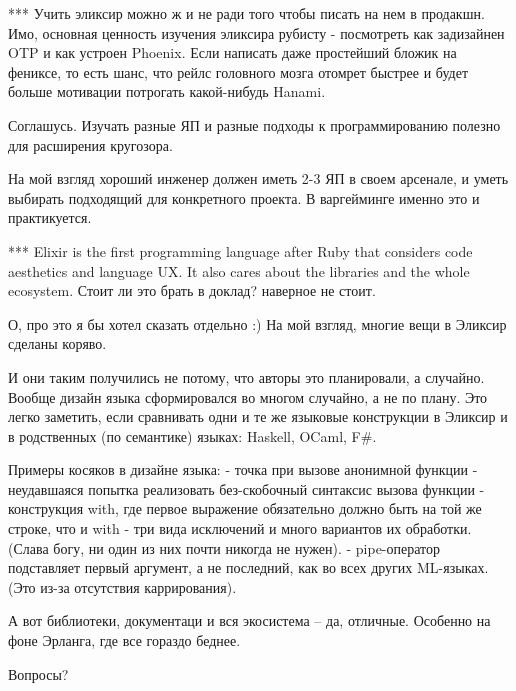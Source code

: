 \documentclass[10pt]{beamer}
\begin{document}
*** Учить эликсир можно ж и не ради того чтобы писать на нем в продакшн.
Имо, основная ценность изучения эликсира рубисту - посмотреть как задизайнен OTP и как устроен Phoenix.
Если написать даже простейший бложик на фениксе, то есть шанс, что рейлс головного мозга отомрет быстрее и будет больше мотивации потрогать какой-нибудь Hanami.

Соглашусь. Изучать разные ЯП и разные подходы к программированию полезно для расширения кругозора.

На мой взгляд хороший инженер должен иметь 2-3 ЯП в своем арсенале, и уметь выбирать подходящий для конкретного проекта.
В варгейминге именно это и практикуется.


*** Elixir is the first programming language after Ruby that considers code aesthetics and language UX. It also cares about the libraries and the whole ecosystem.
Стоит ли это брать в доклад? наверное не стоит.

О, про это я бы хотел сказать отдельно :) На мой взгляд, многие вещи в Эликсир сделаны коряво.

И они таким получились не потому, что авторы это планировали, а случайно.
Вообще дизайн языка сформировался во многом случайно, а не по плану.
Это легко заметить, если сравнивать одни и те же языковые конструкции в Эликсир и в родственных (по семантике) языках: Haskell, OCaml, F#.

Примеры косяков в дизайне языка:
- точка при вызове анонимной функции
- неудавшаяся попытка реализовать без-скобочный синтаксис вызова функции
- конструкция with, где первое выражение обязательно должно быть на той же строке, что и with
- три вида исключений и много вариантов их обработки. (Слава богу, ни один из них почти никогда не нужен).
- pipe-оператор подставляет первый аргумент, а не последний, как во всех других ML-языках. (Это из-за отсутствия каррирования).

А вот библиотеки, документаци и вся экосистема -- да, отличные. Особенно на фоне Эрланга, где все гораздо беднее.

\fi

\begin{frame}
\centering
Вопросы?
\end{frame}
\end{document}
